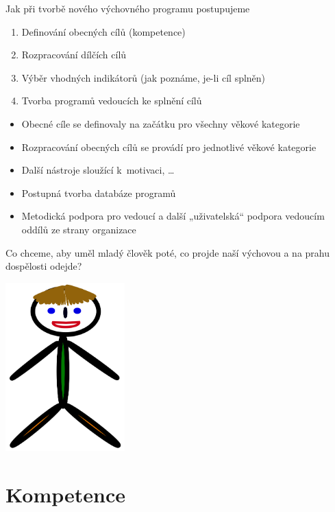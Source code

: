 \documentclass[compress,xelatex,xcolor=dvipsnames,hyperref={pdfpagelabels=false},print]{beamer}
\begin{document}
\begin{frame}{Jak při tvorbě nového výchovného programu postupujeme}
\begin{enumerate}
\item Definování obecných cílů (kompetence)
\item Rozpracování dílčích cílů
\item Výběr vhodných indikátorů (jak poznáme, je-li cíl splněn)
\item Tvorba programů vedoucích ke splnění cílů
\end{enumerate}
\begin{itemize}
\item Obecné cíle se definovaly na začátku pro všechny věkové kategorie
\item Rozpracování obecných cílů se provádí pro jednotlivé věkové kategorie
\item Další nástroje sloužící k~motivaci, \ldots
\item Postupná tvorba databáze programů
\item Metodická podpora pro vedoucí a další „uživatelská“ podpora vedoucím oddílů ze strany organizace
\end{itemize}
\end{frame}

\begin{frame}{Co chceme, aby uměl mladý člověk poté, co projde naší výchovou a na prahu dospělosti odejde?}
\begin{center}
\includegraphics[height=6.5cm]{pepicek.png}
\end{center}
\end{frame}

\section{Kompetence}
\end{document}
